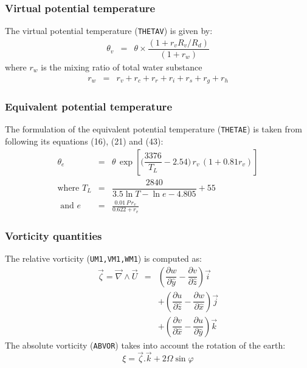 \subsubsection{Virtual potential temperature}
The virtual potential temperature ({\tt THETAV}) is given by:
\begin{eqnarray}
\theta_v &=& \theta \times \dfrac{(1 + r_v R_v /R_d)}
                            {(1+r_w)}
\end{eqnarray}
where $r_w$ is the mixing ratio of total water substance
\begin{eqnarray}
r_w &=& r_v+r_c+r_r+r_i+r_s+r_g+r_h   \nonumber
\end{eqnarray}


\subsubsection{Equivalent potential temperature}
The formulation of the equivalent potential temperature ({\tt THETAE})
is taken from \citet{Bolton1980} following its equations (16), (21) and (43):
\begin{eqnarray}
\theta_e &=& \theta \, \exp \left[\Big(\dfrac{3376}{T_L} - 2.54\Big) 
                    \, r_v \, (1 + 0.81 r_v) \right ] \\
\mbox{where } T_L &=& \dfrac{2840}{3.5 \ln T - \ln e - 4.805} +55 \nonumber \\
\mbox{ and } e   &=& \frac{0.01\, P \, r_v}{0.622 +r_v} \nonumber
\end{eqnarray}


\subsubsection{Vorticity quantities}
The relative vorticity ({\tt UM1,VM1,WM1}) is computed as:
\begin{eqnarray}
\vec\zeta= \vec{\nabla}\wedge\vec{U} &= &
(\dfrac{\partial w}{\partial\hat{y}} - \dfrac{\partial v}{\partial\hat{z}})\vec{i}
\nonumber \\
& &+ (\dfrac{\partial u}{\partial\hat{z}} - \dfrac{\partial w}{\partial\hat{x}})\vec{j}
\nonumber \\
& &+ (\dfrac{\partial v}{\partial\hat{x}} - \dfrac{\partial u}{\partial\hat{y}})\vec{k}
\end{eqnarray}
The absolute vorticity ({\tt ABVOR}) 
takes into account the rotation of the earth:
\begin{equation}
\xi= \vec{\zeta}.\vec{k} + 2 \Omega\sin\varphi
\end{equation}


